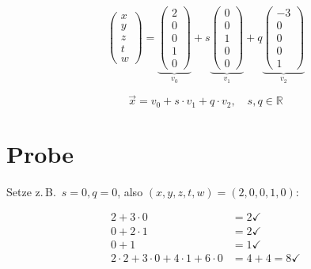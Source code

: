 \documentclass[a4paper,12pt]{article}
\begin{document}
\[
\begin{pmatrix} x \\ y \\ z \\ t \\ w \end{pmatrix}
=
\underbrace{\begin{pmatrix} 2 \\ 0 \\ 0 \\ 1 \\ 0 \end{pmatrix}}_{v_0}
+ s \underbrace{\begin{pmatrix} 0 \\ 0 \\ 1 \\ 0 \\ 0 \end{pmatrix}}_{v_1}
+ q \underbrace{\begin{pmatrix} -3 \\ 0 \\ 0 \\ 0 \\ 1 \end{pmatrix}}_{v_2}
\]

\[
\boxed{\vec{x} = v_0 + s \cdot v_1 + q \cdot v_2, \quad s, q \in \mathbb{R}}
\]

\section*{Probe}

Setze z.\,B.\ $s = 0, q = 0$, also $(x,y,z,t,w) = (2,0,0,1,0)$:

\begin{align*}
2 + 3 \cdot 0 &= 2 \checkmark \\
0 + 2 \cdot 1 &= 2 \checkmark \\
0 + 1 &= 1 \checkmark \\
2 \cdot 2 + 3 \cdot 0 + 4 \cdot 1 + 6 \cdot 0 &= 4 + 4 = 8 \checkmark
\end{align*}
\end{document}
